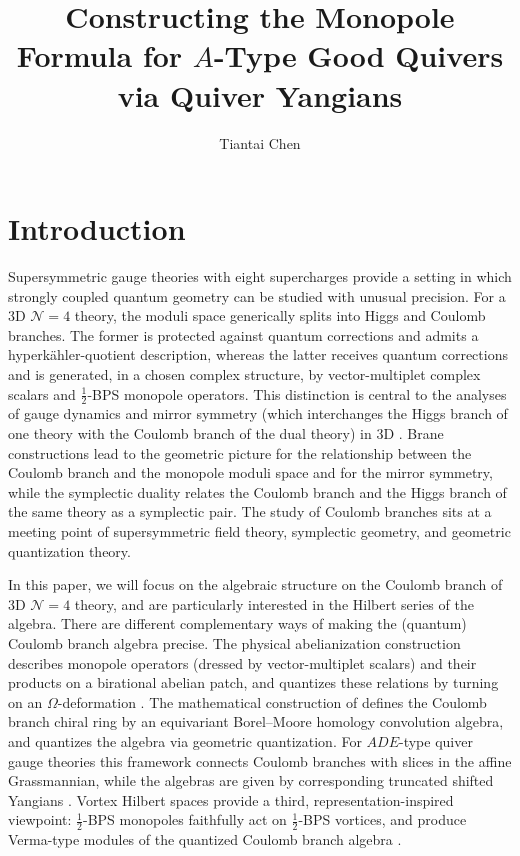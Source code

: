 \documentclass[12pt,a4paper]{article}
\title{
Constructing the Monopole Formula for $A$-Type Good Quivers via Quiver Yangians}
\author[a,b]{Tiantai Chen}
\affiliation[a]{Institute of Theoretical Physics, Chinese Academy of Sciences,\\
	\hspace*{0.3cm}Zhongguancun East Road 55, Beijing 100190, China}
\affiliation[b]{School of Physical Sciences, University of Chinese Academy of Sciences,\\
\hspace*{0.3cm}Yuquan Road 19, Beijing 100049, China}
\begin{document}
\maketitle
\flushbottom

\section{Introduction}
\label{sec:introduction}




Supersymmetric gauge theories with eight supercharges provide a setting in
which strongly coupled quantum geometry can be studied with unusual precision.
For a 3D $\mathcal N=4$ theory, the moduli space generically splits into Higgs and Coulomb branches.
The former is protected against quantum corrections and admits a hyperk\"ahler-quotient description, whereas
the latter receives quantum corrections and is generated, in a chosen complex
structure, by vector-multiplet complex scalars and $\frac 1 2$-BPS monopole operators.  This distinction
is central to the analyses of gauge dynamics
and mirror symmetry (which interchanges the Higgs branch of one theory with the Coulomb branch of the dual theory) in 3D \cite{SeibergWitten1996,IntriligatorSeiberg1996}.  Brane constructions \cite{HananyWitten1997} lead to the geometric picture for the relationship between the Coulomb branch and the monopole moduli space and for the mirror symmetry, while the symplectic duality \cite{braden2022,BullimoreEtAl2016,Kamnitzer2022} relates the Coulomb branch and the Higgs branch of the same theory as a symplectic pair.
The study of Coulomb branches sits at a
meeting point of supersymmetric field theory, symplectic geometry, and
geometric quantization theory.

\medskip

In this paper,  we will focus on the algebraic structure on the Coulomb branch of 3D $\mathcal N=4$ theory, and are particularly interested in the Hilbert series of the algebra.
There are different complementary ways of making the (quantum) Coulomb branch algebra precise.
The physical abelianization construction describes monopole operators (dressed by vector-multiplet scalars) and their
products on a birational abelian patch, and quantizes these relations by turning on an
$\Omega$-deformation \cite{BullimoreDimofteGaiotto2017,Nekrasov_2010}.
The mathematical construction of \cite{Nakajima2016,BFN2018}
defines the Coulomb branch chiral ring by an equivariant Borel--Moore homology convolution
algebra, and quantizes the algebra via geometric quantization.  For $ADE$-type quiver gauge theories this framework
connects Coulomb branches with slices in the affine Grassmannian, while the algebras are given by corresponding truncated shifted Yangians \cite{BFN2019}.  Vortex Hilbert spaces provide a third, representation-inspired
viewpoint: $\frac{1}{2}$-BPS monopoles faithfully act on $\frac 1 2$-BPS vortices, and produce Verma-type
modules of the quantized Coulomb branch algebra
\cite{BullimoreEtAl2018,BullimoreEtAl2016}.  
\end{document}
